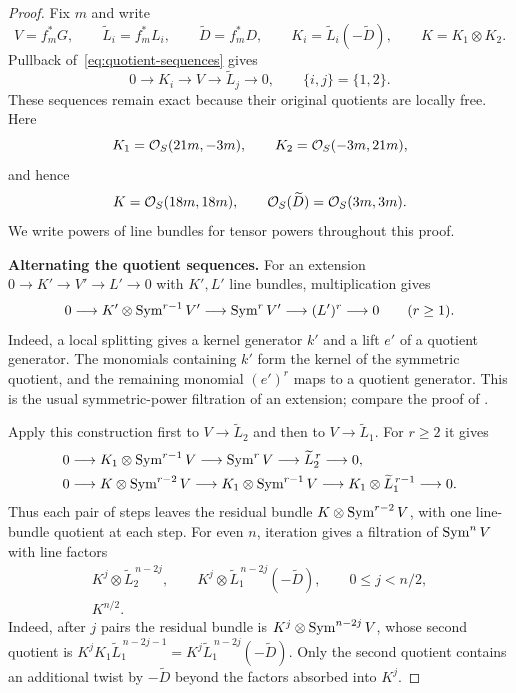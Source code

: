 \begin{proof}
Fix $m$ and write
\[
 V=f_m^*G,\qquad \widetilde L_i=f_m^*L_i,\qquad
 \widetilde D=f_m^*D,\qquad
 K_i=\widetilde L_i(-\widetilde D),\qquad K=K_1\otimes K_2.
\]
Pullback of~\eqref{eq:quotient-sequences} gives
\begin{equation}\label{eq:pullback-quotients}
 0\longrightarrow K_i\longrightarrow V\longrightarrow
 \widetilde L_j\longrightarrow0,
 \qquad\{i,j\}=\{1,2\}.
\end{equation}
These sequences remain exact because their original quotients
are locally free. Here
\[
 K_1=\mathcal O_S(21m,-3m),\qquad K_2=\mathcal O_S(-3m,21m),
\]
and hence
\begin{equation}\label{eq:kernel-product}
 K=\mathcal O_S(18m,18m),\qquad
 \mathcal O_S(\widetilde D)=\mathcal O_S(3m,3m).
\end{equation}
We write powers of line bundles for tensor powers throughout this
proof.

\smallskip\noindent\textbf{Alternating the quotient sequences.}
For an extension $0\to K'\to V'\to L'\to0$ with $K',L'$ line
bundles, multiplication gives
\[
 0\longrightarrow K'\otimes\operatorname{Sym}^{r-1}V'
   \longrightarrow\operatorname{Sym}^r V'\longrightarrow(L')^r
   \longrightarrow0\qquad(r\geq1).
\]
Indeed, a local splitting gives a kernel generator $k'$ and a lift
$e'$ of a quotient generator. The monomials containing $k'$ form the
kernel of the symmetric quotient, and the remaining monomial $(e')^r$
maps to a quotient generator. This is the usual symmetric-power
filtration of an extension; compare the proof of
\cite[Corollary~3.4]{Hartshorne1966}.

Apply this construction first to $V\to\widetilde L_2$ and then to
$V\to\widetilde L_1$. For $r\geq2$ it gives
\begin{align}
 0&\longrightarrow K_1\otimes\operatorname{Sym}^{r-1}V
   \longrightarrow\operatorname{Sym}^r V\longrightarrow\widetilde L_2^{\,r}
   \longrightarrow0,\label{eq:symmetric-first}\\
 0&\longrightarrow K\otimes\operatorname{Sym}^{r-2}V
   \longrightarrow K_1\otimes\operatorname{Sym}^{r-1}V
   \longrightarrow K_1\otimes\widetilde L_1^{\,r-1}
   \longrightarrow0.\label{eq:symmetric-second}
\end{align}
Thus each pair of steps leaves the residual bundle
$K\otimes\operatorname{Sym}^{r-2}V$, with one line-bundle quotient at each step.
For even $n$, iteration gives a filtration of $\operatorname{Sym}^nV$ with line
factors
\begin{equation}\label{eq:graded-lines}
 \begin{gathered}
 K^j\otimes\widetilde L_2^{\,n-2j},\qquad
 K^j\otimes\widetilde L_1^{\,n-2j}(-\widetilde D),
 \qquad 0\leq j<n/2,\\
 K^{n/2}.
 \end{gathered}
\end{equation}
Indeed, after $j$ pairs the residual bundle is
$K^j\otimes\operatorname{Sym}^{n-2j}V$, whose second quotient is
$K^jK_1\widetilde L_1^{\,n-2j-1}
 =K^j\widetilde L_1^{\,n-2j}(-\widetilde D)$.
Only the second quotient contains an additional twist by
$-\widetilde D$ beyond the factors absorbed into $K^j$.


\end{proof}
